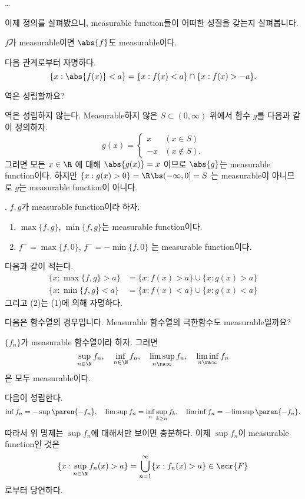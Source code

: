 \dots

이제 정의를 살펴봤으니, measurable function들이 어떠한 성질을 갖는지 살펴봅니다.

 \(f\)가 measurable이면 \(\abs{f}\)도 measurable이다.

\pf 다음 관계로부터 자명하다.
\[
    \{x : \abs{f(x)} < a\} = \{x : f(x) < a\} \cap \{x : f(x) > -a\}.
\]

역은 성립할까요?

\rmk 역은 성립하지 않는다. Measurable하지 않은 \(S \subset (0, \infty)\) 위에서 함수 \(g\)를 다음과 같이 정의하자.
\[
    g(x) = \begin{cases}
        x & (x \in S) \\ -x & (x \notin S).
    \end{cases}
\]
그러면 모든 \(x \in \R\) 에 대해 \(\abs{g(x)} = x\) 이므로 \(\abs{g}\)는 measurable function이다. 하지만 \(\{x : g(x) > 0\} = \R \bs (-\infty, 0] = S\) 는 measurable이 아니므로 \(g\)는 measurable function이 아니다.

\prop. \(f, g\)가 measurable function이라 하자.
\begin{enumerate}
    \item \(\max\{f, g\}\), \(\min\{f, g\}\)는 measurable function이다.
    \item \(f^+ = \max\{f, 0\}\), \(f^- = -\min\{f, 0\}\) 는 measurable function이다.
\end{enumerate}

\pf 다음과 같이 적는다.
\[
    \begin{aligned}
        \{x : \max\{f, g\} > a\} & = \{x : f(x) > a\} \cup \{x : g(x) > a\} \\
        \{x : \min\{f, g\} < a\} & = \{x : f(x) < a\} \cup \{x : g(x) < a\}
    \end{aligned}
\]
그리고 (2)는 (1)에 의해 자명하다.

다음은 함수열의 경우입니다. Measurable 함수열의 극한함수도 measurable일까요?

 \(\{f_n\}\)가 measurable 함수열이라 하자. 그러면
\[
    \sup_{n\in \N} f_n, \quad \inf_{n\in \N} f_n, \quad \limsup_{n \ra \infty} f_n, \quad \liminf_{n \ra \infty} f_n
\]
은 모두 measurable이다.

\pf 다음이 성립한다.
\[
    \inf f_n = -\sup\paren{-f_n}, \quad \limsup f_n = \inf_n \sup_{k\geq n} f_k, \quad \liminf f_n = -\limsup\paren{-f_n}.
\]
따라서 위 명제는 \(\sup f_n\)에 대해서만 보이면 충분하다. 이제 \(\sup f_n\)이 measurable function인 것은
\[
    \{x : \sup_{n\in\N} f_n(x) > a\} =  \bigcup_{n=1}^{\infty} \{x : f_n(x) > a\} \in \scr{F}
\]
로부터 당연하다.

